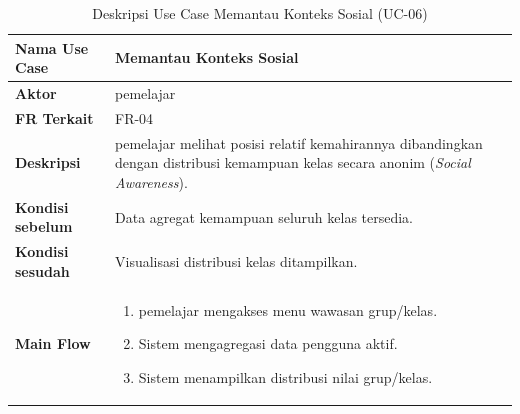 \begin{table}[H]
    \centering
    \caption{Deskripsi Use Case Memantau Konteks Sosial (UC-06)}
    \label{tbl:desc_uc06}
    \begin{tabular}{|p{}|p{}|}
        \hline
        \textbf{Nama Use Case} & \textbf{Memantau Konteks Sosial} \\
        \hline
        \textbf{Aktor} & pemelajar \\
        \hline
        \textbf{FR Terkait} & FR-04 \\
        \hline
        \textbf{Deskripsi} & pemelajar melihat posisi relatif kemahirannya dibandingkan dengan distribusi kemampuan kelas secara anonim (\textit{Social Awareness}). \\
        \hline
        \textbf{Kondisi sebelum} & Data agregat kemampuan seluruh kelas tersedia. \\
        \hline
        \textbf{Kondisi sesudah} & Visualisasi distribusi kelas ditampilkan. \\
        \hline
        \textbf{Main Flow} & \begin{enumerate}[noitemsep,topsep=0pt,leftmargin=*]
            \item pemelajar mengakses menu wawasan grup/kelas.
            \item Sistem mengagregasi data pengguna aktif.
            \item Sistem menampilkan distribusi nilai grup/kelas.
        \end{enumerate} \\
        \hline
    \end{tabular}
\end{table}